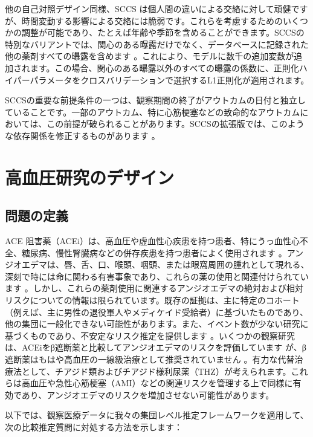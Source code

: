 \documentclass[
  11pt]{book}
\theoremstyle{definition}
\theoremstyle{definition}
\theoremstyle{definition}
\theoremstyle{definition}
\theoremstyle{remark}
\begin{document}
他の自己対照デザイン同様、SCCS は個人間の違いによる交絡に対して頑健ですが、時間変動する影響による交絡には脆弱です。これらを考慮するためのいくつかの調整が可能であり、たとえば年齢や季節を含めることができます。SCCSの特別なバリアントでは、関心のある曝露だけでなく、データベースに記録された他の薬剤すべての曝露を含めます \citep{simpson_2013}。これにより、モデルに数千の追加変数が追加されます。この場合、関心のある曝露以外のすべての曝露の係数に、正則化ハイパーパラメータをクロスバリデーションで選択するL1正則化が適用されます。

SCCSの重要な前提条件の一つは、観察期間の終了がアウトカムの日付と独立していることです。一部のアウトカム、特に心筋梗塞などの致命的なアウトカムにおいては、この前提が破られることがあります。SCCSの拡張版では、このような依存関係を修正するものがあります \citep{farrington_2011}。

\section{高血圧研究のデザイン}\label{ux9ad8ux8840ux5727ux7814ux7a76ux306eux30c7ux30b6ux30a4ux30f3}

\subsection{問題の定義}\label{ux554fux984cux306eux5b9aux7fa9-1}

ACE 阻害薬（ACEi）は、高血圧や虚血性心疾患を持つ患者、特にうっ血性心不全、糖尿病、慢性腎臓病などの併存疾患を持つ患者によく使用されます \citep{zaman_2002}。アンジオエデマは、唇、舌、口、喉頭、咽頭、または眼窩周囲の腫れとして現れる、深刻で時には命に関わる有害事象であり、これらの薬の使用と関連付けられています \citep{sabroe_1997}。しかし、これらの薬剤使用に関連するアンジオエデマの絶対および相対リスクについての情報は限られています。既存の証拠は、主に特定のコホート（例えば、主に男性の退役軍人やメディケイド受給者）に基づいたものであり、他の集団に一般化できない可能性があります。また、イベント数が少ない研究に基づくものであり、不安定なリスク推定を提供します \citep{powers_2012}。いくつかの観察研究は、ACEiをβ遮断薬と比較してアンジオエデマのリスクを評価しています \citep{magid_2010, toh_2012}が、β遮断薬はもはや高血圧の一線級治療として推奨されていません \citep{whelton_2018}。有力な代替治療法として、チアジド類およびチアジド様利尿薬（THZ）が考えられます。これらは高血圧や急性心筋梗塞（AMI）などの関連リスクを管理する上で同様に有効であり、アンジオエデマのリスクを増加させない可能性があります。

以下では、観察医療データに我々の集団レベル推定フレームワークを適用して、次の比較推定質問に対処する方法を示します：
\end{document}
